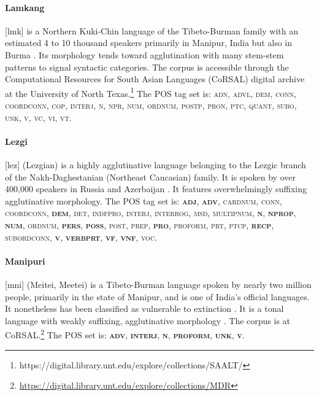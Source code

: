 \paragraph{Lamkang} [lmk] is a Northern Kuki-Chin language of the Tibeto-Burman family with an estimated 4 to 10 thousand speakers primarily in Manipur, India but also in Burma \cite{lamkang_2007}. 
Its morphology tends toward agglutination with many stem-stem patterns to signal syntactic categories. The corpus is accessible through the Computational Resources for South Asian Languages (CoRSAL) digital archive at the University of North Texas.\footnote{https://digital.library.unt.edu/explore/collections/SAALT/} The POS tag set is: \textsc{adn, advl, dem, conn, coordconn, cop, interj, n, npr, num, ordnum, postp, pron, ptc, quant, subo, unk,   v, vc, vi, vt}.

\paragraph{Lezgi} [lez] (Lezgian) is a highly agglutinative language belonging to the Lezgic branch of the Nakh-Daghestanian (Northeast Caucasian) family. It is spoken by over 400,000 speakers in Russia and Azerbaijan \cite{eberhard_ethnologue:2020}. It features overwhelmingly suffixing agglutinative morphology. The POS tag set is: \textsc{\textbf{adj}, \textbf{adv}, cardnum, conn, coordconn, \textbf{dem}, det, indfpro, interj, interrog, msd, multipnum, \textbf{n}, \textbf{nprop}, \textbf{num}, ordnum, \textbf{pers}, \textbf{poss}, post, prep, \textbf{pro}, proform, prt, ptcp, \textbf{recp}, subordconn, \textbf{v}, \textbf{verbprt}, \textbf{vf}, \textbf{vnf}, voc}.

\paragraph{Manipuri} [mni] (Meitei, Meetei) is a Tibeto-Burman language spoken by nearly two million people, primarily in the state of Manipur, and is one of India's official languages. It nonetheless has been classified as vulnerable to extinction \cite{moseley_atlas_2010}. It is a tonal language with weakly suffixing, agglutinative morphology \citep{Chelliah-1997}. The corpus is at CoRSAL.\footnote{\url{https://digital.library.unt.edu/explore/collections/MDR}} The POS set is: \textsc{\textbf{adv}, \textbf{interj}, \textbf{n}, \textbf{proform}, \textbf{unk}, \textbf{v}}. 

